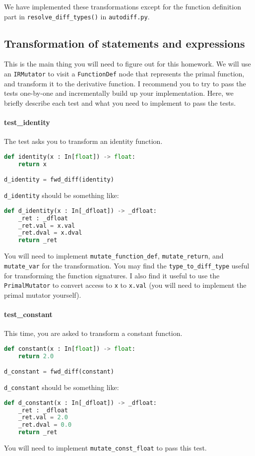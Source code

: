 We have implemented these transformations except for the function definition part in \lstinline{resolve_diff_types()} in \lstinline{autodiff.py}.

\subsection{Transformation of statements and expressions}
This is the main thing you will need to figure out for this homework. We will use an \lstinline{IRMutator} to visit a \lstinline{FunctionDef} node that represents the primal function, and transform it to the derivative function. I recommend you to try to pass the tests one-by-one and incrementally build up your implementation. Here, we briefly describe each test and what you need to implement to pass the tests.

\paragraph{test_identity} The test asks you to transform an identity function.
\begin{lstlisting}[language=Python]
def identity(x : In[float]) -> float:
    return x

d_identity = fwd_diff(identity)
\end{lstlisting}
\lstinline{d_identity} should be something like:
\begin{lstlisting}[language=Python]
def d_identity(x : In[_dfloat]) -> _dfloat:
	_ret : _dfloat
	_ret.val = x.val
	_ret.dval = x.dval
	return _ret
\end{lstlisting}
You will need to implement \lstinline{mutate_function_def}, \lstinline{mutate_return}, and \lstinline{mutate_var} for the transformation. You may find the \lstinline{type_to_diff_type} useful for transforming the function signatures. I also find it useful to use the \lstinline{PrimalMutator} to convert access to \lstinline{x} to \lstinline{x.val} (you will need to implement the primal mutator yourself).

\paragraph{test_constant} This time, you are asked to transform a constant function.
\begin{lstlisting}[language=Python]
def constant(x : In[float]) -> float:
    return 2.0

d_constant = fwd_diff(constant)
\end{lstlisting}
\lstinline{d_constant} should be something like:
\begin{lstlisting}[language=Python]
def d_constant(x : In[_dfloat]) -> _dfloat:
	_ret : _dfloat
	_ret.val = 2.0
	_ret.dval = 0.0
	return _ret
\end{lstlisting}
You will need to implement \lstinline{mutate_const_float} to pass this test.

